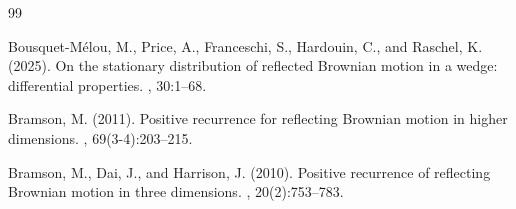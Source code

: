 \documentclass[11pt]{article}
\theoremstyle{definition}
\begin{document}
\begin{thebibliography}{99}



Bousquet-M{\'e}lou, M., Price, A., Franceschi, S., Hardouin, C., and Raschel, K. (2025).
\newblock On the stationary distribution of reflected Brownian motion in a wedge: differential properties.
, 30:1--68.




Bramson, M. (2011).
\newblock Positive recurrence for reflecting {B}rownian motion in higher
  dimensions.
, 69(3-4):203--215.

Bramson, M., Dai, J., and Harrison, J. (2010).
\newblock Positive recurrence of reflecting {B}rownian motion in three
  dimensions.
, 20(2):753--783.


\end{thebibliography}
\end{document}
